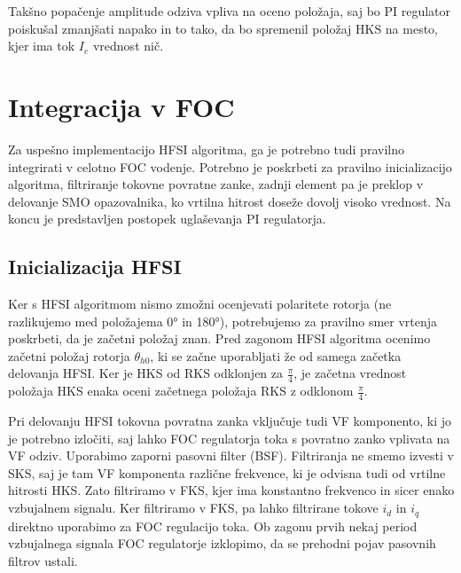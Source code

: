 \documentclass[a4paper,twoside,openright,12pt,slovene]{book}
\begin{document}
Takšno popačenje amplitude odziva vpliva na oceno položaja, saj bo PI regulator poiskušal zmanjšati napako in to tako, da bo spremenil položaj HKS na mesto, kjer ima tok $I_e$ vrednost nič.

\chapter{Integracija v FOC} \label{integracija}

Za uspešno implementacijo HFSI algoritma, ga je potrebno tudi pravilno integrirati v celotno FOC vodenje. Potrebno je poskrbeti za pravilno inicializacijo algoritma, filtriranje tokovne povratne
zanke, zadnji element pa je preklop v delovanje SMO opazovalnika, ko vrtilna hitrost doseže dovolj visoko vrednost. Na koncu je predstavljen postopek uglaševanja PI regulatorja.

\section{Inicializacija HFSI}

Ker s HFSI algoritmom nismo zmožni ocenjevati polaritete rotorja (ne razlikujemo med položajema 0° in 180°), potrebujemo za pravilno smer vrtenja poskrbeti, da je začetni položaj znan. Pred zagonom
HFSI algoritma ocenimo začetni položaj rotorja $\theta_{h0}$\cite{IPDBoussak}, ki se začne uporabljati že od samega začetka delovanja HFSI. Ker je HKS od RKS odklonjen za $\frac{\pi}{4}$, je začetna
vrednost položaja HKS enaka oceni začetnega položaja RKS z odklonom $\frac{\pi}{4}$.

Pri delovanju HFSI tokovna povratna zanka vključuje tudi VF komponento, ki jo je potrebno izločiti, saj lahko FOC regulatorja toka s povratno zanko vplivata na VF odziv. Uporabimo zaporni pasovni
filter (BSF). Filtriranja ne smemo izvesti v SKS, saj je tam VF komponenta različne frekvence, ki je odvisna tudi od vrtilne hitrosti HKS. Zato filtriramo v FKS, kjer ima konstantno frekvenco in sicer
enako vzbujalnem signalu. Ker filtriramo v FKS, pa lahko filtrirane tokove $i_d$ in $i_q$ direktno uporabimo za FOC regulacijo toka. Ob zagonu prvih nekaj period vzbujalnega signala FOC regulatorje
izklopimo, da se prehodni pojav pasovnih filtrov ustali. 
\end{document}
